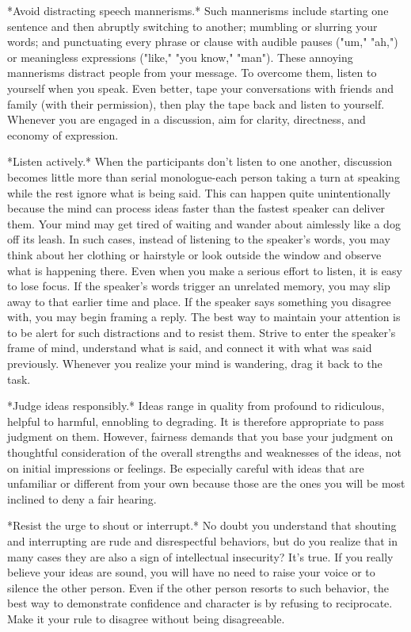 \documentclass{book}
\begin{document}
*Avoid distracting speech mannerisms.* Such mannerisms include starting one sentence and then abruptly switching to another; mumbling or slurring your words; and punctuating every phrase or clause with audible pauses ("um," "ah,") or meaningless expressions ("like," "you know," "man"). These annoying mannerisms distract people from your message. To overcome them, listen to yourself when you speak. Even better, tape your conversations with friends and family (with their permission), then play the tape back and listen to yourself. Whenever you are engaged in a discussion, aim for clarity, directness, and economy of expression.

*Listen actively.* When the participants don’t listen to one another, discussion becomes little more than serial monologue-each person taking a turn at speaking while the rest ignore what is being said. This can happen quite unintentionally because the mind can process ideas faster than the fastest speaker can deliver them. Your mind may get tired of waiting and wander about aimlessly like a dog off its leash. In such cases, instead of listening to the speaker’s words, you may think about her clothing or hairstyle or look outside the window and observe what is happening there. Even when you make a serious effort to listen, it is easy to lose focus. If the speaker’s words trigger an unrelated memory, you may slip away to that earlier time and place. If the speaker says something you disagree with, you may begin framing a reply. The best way to maintain your attention is to be alert for such distractions and to resist them. Strive to enter the speaker’s frame of mind, understand what is said, and connect it with what was said previously. Whenever you realize your mind is wandering, drag it back to the task.

*Judge ideas responsibly.* Ideas range in quality from profound to ridiculous, helpful to harmful, ennobling to degrading. It is therefore appropriate to pass judgment on them. However, fairness demands that you base your judgment on thoughtful consideration of the overall strengths and weaknesses of the ideas, not on initial impressions or feelings. Be especially careful with ideas that are unfamiliar or different from your own because those are the ones you will be most inclined to deny a fair hearing.

*Resist the urge to shout or interrupt.* No doubt you understand that shouting and interrupting are rude and disrespectful behaviors, but do you realize that in many cases they are also a sign of intellectual insecurity? It’s true. If you really believe your ideas are sound, you will have no need to raise your voice or to silence the other person. Even if the other person resorts to such behavior, the best way to demonstrate confidence and character is by refusing to reciprocate. Make it your rule to disagree without being disagreeable.
\end{document}
